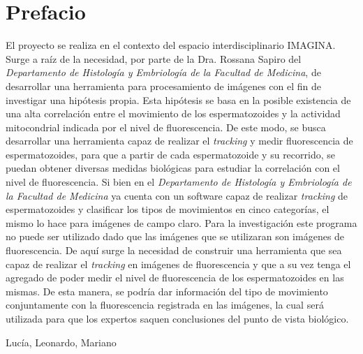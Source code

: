 \chapter{Prefacio}

El proyecto se realiza en el contexto del espacio interdisciplinario IMAGINA. Surge a raíz de la necesidad, por parte de la Dra. Rossana Sapiro del \textit{ Departamento de Histología y Embriología de la Facultad de Medicina}, de desarrollar una herramienta para procesamiento de imágenes con el fin de investigar una hipótesis propia. Esta hipótesis se basa en la posible existencia de una alta correlación entre el movimiento de los espermatozoides y la actividad mitocondrial indicada por el nivel de fluorescencia. De este modo, se busca desarrollar una herramienta capaz de realizar el \textit{tracking} y medir fluorescencia de espermatozoides, para que a partir de cada espermatozoide y su recorrido, se puedan obtener diversas medidas biológicas para estudiar la correlación con el nivel de fluorescencia.
Si bien en el \textit{ Departamento de Histología y Embriología de la Facultad de Medicina} ya cuenta con un software capaz de realizar \textit{tracking} de espermatozoides y clasificar los tipos de movimientos en cinco categorías, el mismo lo hace para imágenes de campo claro. Para la investigación este programa no puede ser utilizado dado que las imágenes que se utilizaran son imágenes de fluorescencia. De aquí surge la necesidad de construir una herramienta que  sea capaz de realizar el \textit{tracking} en imágenes de fluorescencia y que a su vez tenga el agregado de poder medir el nivel de fluorescencia de los espermatozoides en las mismas. De esta manera, se podría dar información del tipo de movimiento conjuntamente con la fluorescencia registrada en las imágenes, la cual será utilizada para que los expertos saquen conclusiones del punto de vista biológico.

\thispagestyle{plain}

\begin{flushright}
Lucía, Leonardo, Mariano
\end{flushright}
